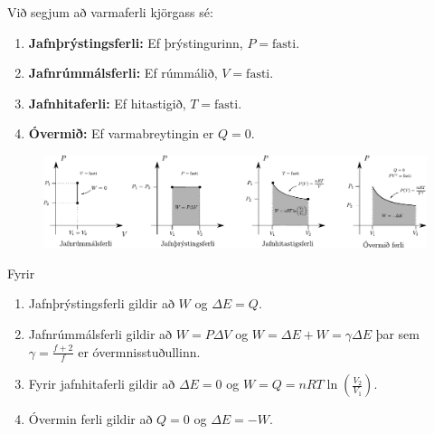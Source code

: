 \begin{tcolorbox}
\begin{definition}
Við segjum að varmaferli kjörgass sé:
\begin{enumerate}[label =\textbf{ (\roman*)}]
    \item \textbf{Jafnþrýstingsferli:} Ef þrýstingurinn, $P = \text{fasti}$.
    \item \textbf{Jafnrúmmálsferli:} Ef rúmmálið, $V = \text{fasti}$.
    \item \textbf{Jafnhitaferli:} Ef hitastigið, $T = \text{fasti}$.
    \item \textbf{Óvermið:} Ef varmabreytingin er $Q = 0$.
\end{enumerate}
\end{definition}

\begin{figure}[H]
    \centering
    \includegraphics[width = \textwidth]{figures/varmaferlin.pdf}
\end{figure}
\end{tcolorbox}


\begin{tcolorbox}
\begin{theorem} Fyrir
\begin{enumerate}[label =\textbf{ (\roman*)}]
    \item Jafnþrýstingsferli gildir að $W$ og $\Delta E = Q$.
    \item Jafnrúmmálsferli gildir að $W = P \Delta V$ og $W = \Delta E + W = \gamma \Delta E$ þar sem $\gamma = \frac{f+2}{f}$ er óvermnisstuðullinn.
    \item Fyrir jafnhitaferli gildir að $\Delta E = 0$ og $W = Q = nRT\ln(\frac{V_2}{V_1})$.
    \item Óvermin ferli gildir að $Q = 0$ og $\Delta E = -W$.
\end{enumerate}
\end{theorem}
\end{tcolorbox}

